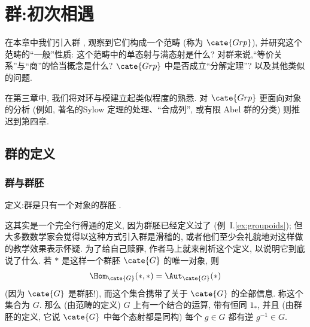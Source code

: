 
\chapter{群:初次相遇}
\label{chap:groups1}


在本章中我们引入群%
, 观察到它们构成一个范畴 (称为 $\cate{Grp}$), 并研究这个范畴的``一般''性质: 这个范畴中的单态射与满态射是什么? 对群来说,``等价关系''与``商''的恰当概念是什么? $\cate{Grp}$ 中是否成立``分解定理''? 以及其他类似的问题.

在第三章中, 我们将对环与模建立起类似程度的熟悉. 对 $\cate{Grp}$ 更面向对象的分析 (例如, 著名的Sylow%
定理的处理、``合成列'', 或有限 Abel 群的分类) 则推迟到第四章.

\section{群的定义}
\label{sec:def-group}

\subsection{群与群胚}
\label{subsec:groups-groupoids}

\begin{joke}
\label{joke:group}
定义:群是只有一个对象的群胚%
.
\end{joke}

这其实是一个完全行得通的定义, 因为群胚已经定义过了 (例~I.\ref{ex:groupoids}); 但大多数数学家会觉得以这种方式引入群是滑稽的, 或者他们至少会礼貌地对这样做的教学效果表示怀疑. 为了给自己赎罪, 作者马上就来剖析这个定义, 以说明它到底说了什么. 若 $*$ 是这样一个群胚 $\cate{G}$ 的唯一对象, 则
\[
\Hom_{\cate{G}}(*, *) = \Aut_{\cate{G}}(*)
\]
(因为 $\cate{G}$ 是群胚!), 而这个集合携带了关于 $\cate{G}$ 的全部信息. 称这个集合为 $G$. 那么 (由范畴的定义) $G$ 上有一个结合的运算, 带有恒同 $1_{*}$, 并且 (由群胚的定义, 它说 $\cate{G}$ 中每个态射都是同构) 每个 $g \in G$ 都有逆 $g^{-1} \in G$.

